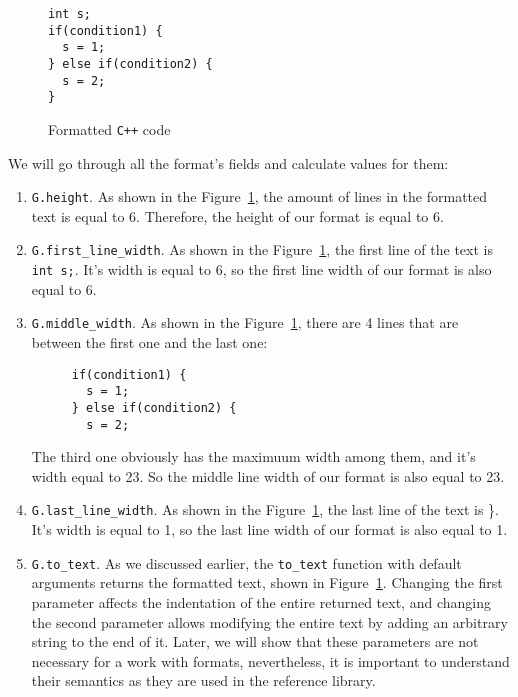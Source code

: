 \documentclass[14pt]{constructor-diploma}
\begin{document}
\begin{figure}[H]

\begin{mdframed}[backgroundcolor=bg]
\begin{verbatim}
int s;
if(condition1) { 
  s = 1; 
} else if(condition2) { 
  s = 2; 
}
\end{verbatim}
\end{mdframed}
\caption{Formatted \texttt{C++} code}
\label{fig:format_text}
\end{figure}

We will go through all the format's fields and calculate values for them:

\begin{enumerate}
  \item \texttt{G.height}. As shown in the Figure~\ref{fig:format_text}, the amount of lines in 
  the formatted text is equal to 6. Therefore, the height of our format is equal to 6.
  \item \texttt{G.first\_line\_width}. As shown in the Figure~\ref{fig:format_text}, 
  the first line of the text is \texttt{int s;}. It's width is equal to 6, so 
  the first line width of our format is also equal to 6.
  \item \texttt{G.middle\_width}. As shown in the Figure~\ref{fig:format_text}, there are 4
  lines that are between the first one and the last one:
\begin{figure}[H]
\begin{verbatim}
if(condition1) { 
  s = 1; 
} else if(condition2) { 
  s = 2; 
\end{verbatim}
\end{figure}
\vspace*{-25pt}
  The third one obviously has the maximuum width among them, and it's width equal to 23. So the middle line width 
  of our format is also equal to 23.
  \item \texttt{G.last\_line\_width}. As shown in the Figure~\ref{fig:format_text}, the last line of the 
  text is \}. It's width is equal to 1, so the last line width of our format is also equal to 1.
  \item \texttt{G.to\_text}. As we discussed earlier, the \texttt{to\_text} function with default arguments returns the formatted text, shown 
  in Figure~\ref{fig:format_text}. 
  Changing the first parameter affects the indentation of the entire returned text, and changing the second parameter allows modifying the entire text by adding an arbitrary string to the end of it. 
  Later, we will show that these parameters are not necessary for a work with formats, nevertheless, it is important to understand their semantics as they are used in the reference library.


\end{enumerate}
\end{document}
